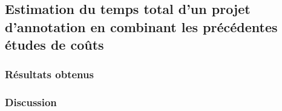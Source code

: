 	
	\subsection{Estimation du temps total d'un projet d'annotation en combinant les précédentes études de coûts}
	\label{section:4.3.4-ETUDE-COUTS-TOTAL}

		\subsubsection{Résultats obtenus}

		\subsubsection{Discussion}